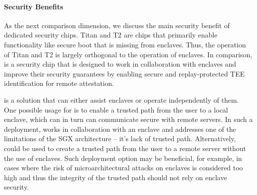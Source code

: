 \paragraph{Security Benefits}
As the next comparison dimension, we discuss the main security benefit of dedicated security chips. Titan and T2 are chips that primarily enable functionality like secure boot that is missing from enclaves. Thus, the operation of Titan and T2 is largely orthogonal to the operation of enclaves. 
%
In comparison, \proximitee is a security chip that is designed to work in collaboration with enclaves and improve their security guarantees by enabling secure and replay-protected TEE identification for remote attestation. 

\protection is a solution that can either assist enclaves or operate independently of them. One possible usage for \protection is to enable a trusted path from the user to a local enclave, which can in turn can communicate secure with remote servers. In such a deployment, \protection works in collaboration with an enclave and addresses one of the limitations of the SGX architecture -- it’s lack of trusted path. Alternatively, \protection could be used to create a trusted path from the user to a remote server without the use of enclaves. Such deployment option may be beneficial, for example, in cases where the risk of microarchitectural attacks on enclaves is considered too high and thus the integrity of the trusted path should not rely on enclave security.


